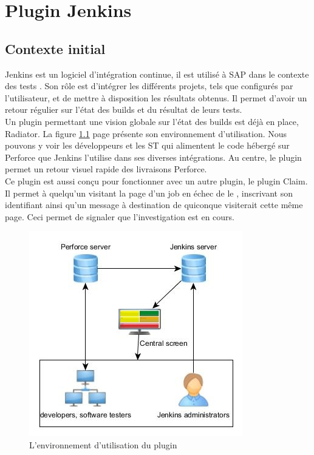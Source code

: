 \chapter{Plugin Jenkins}

\section{Contexte initial}

Jenkins est un logiciel d'intégration continue, il est utilisé à SAP dans le contexte des tests . Son rôle est d'intégrer les différents projets, tels que configurés par l'utilisateur, et de mettre à disposition les résultats obtenus. Il permet d'avoir un retour régulier sur l'état des builds et du résultat de leurs tests.\\

Un plugin permettant une vision globale sur l'état des builds est déjà en place, Radiator. La figure \ref{figure:reportingPluginEnvironmentAfter} page \pageref{figure:reportingPluginEnvironmentAfter} présente son environnement d'utilisation. Nous pouvons y voir les développeurs et les ST qui alimentent le code hébergé sur Perforce que Jenkins l'utilise dans ses diverses intégrations. Au centre, le plugin permet un retour visuel rapide des livraisons Perforce.\\
Ce plugin est aussi conçu pour fonctionner avec un autre plugin, le plugin Claim. Il permet à quelqu'un visitant la page d'un job en échec de le , inscrivant son identifiant ainsi qu'un message à destination de quiconque visiterait cette même page. Ceci permet de signaler que l'investigation est en cours.\\

\begin{figure}[!h]
  \centering
      \includegraphics{images/reportingPluginEnvironmentAfter.jpg}
  \caption{L'environnement d'utilisation du plugin}
	\label{figure:reportingPluginEnvironmentAfter}
\end{figure}

